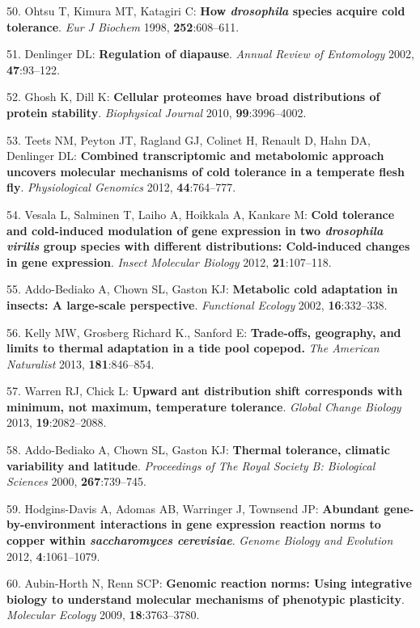 \documentclass[]{article}
\begin{document}
50. Ohtsu T, Kimura MT, Katagiri C: \textbf{How \emph{drosophila}
species acquire cold tolerance}. \emph{Eur J Biochem} 1998,
\textbf{252}:608--611.

51. Denlinger DL: \textbf{Regulation of diapause}. \emph{Annual Review
of Entomology} 2002, \textbf{47}:93--122.

52. Ghosh K, Dill K: \textbf{Cellular proteomes have broad distributions
of protein stability}. \emph{Biophysical Journal} 2010,
\textbf{99}:3996--4002.

53. Teets NM, Peyton JT, Ragland GJ, Colinet H, Renault D, Hahn DA,
Denlinger DL: \textbf{Combined transcriptomic and metabolomic approach
uncovers molecular mechanisms of cold tolerance in a temperate flesh
fly}. \emph{Physiological Genomics} 2012, \textbf{44}:764--777.

54. Vesala L, Salminen T, Laiho A, Hoikkala A, Kankare M: \textbf{Cold
tolerance and cold-induced modulation of gene expression in two
\emph{drosophila virilis} group species with different distributions:
Cold-induced changes in gene expression}. \emph{Insect Molecular
Biology} 2012, \textbf{21}:107--118.

55. Addo-Bediako A, Chown SL, Gaston KJ: \textbf{Metabolic cold
adaptation in insects: A large-scale perspective}. \emph{Functional
Ecology} 2002, \textbf{16}:332--338.

56. Kelly MW, Grosberg Richard K., Sanford E: \textbf{Trade-offs,
geography, and limits to thermal adaptation in a tide pool copepod.}
\emph{The American Naturalist} 2013, \textbf{181}:846--854.

57. Warren RJ, Chick L: \textbf{Upward ant distribution shift
corresponds with minimum, not maximum, temperature tolerance}.
\emph{Global Change Biology} 2013, \textbf{19}:2082--2088.

58. Addo-Bediako A, Chown SL, Gaston KJ: \textbf{Thermal tolerance,
climatic variability and latitude}. \emph{Proceedings of The Royal
Society B: Biological Sciences} 2000, \textbf{267}:739--745.

59. Hodgins-Davis A, Adomas AB, Warringer J, Townsend JP:
\textbf{Abundant gene-by-environment interactions in gene expression
reaction norms to copper within \emph{saccharomyces cerevisiae}}.
\emph{Genome Biology and Evolution} 2012, \textbf{4}:1061--1079.

60. Aubin-Horth N, Renn SCP: \textbf{Genomic reaction norms: Using
integrative biology to understand molecular mechanisms of phenotypic
plasticity}. \emph{Molecular Ecology} 2009, \textbf{18}:3763--3780.
\end{document}
